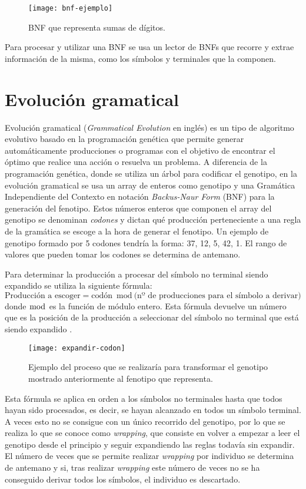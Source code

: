 \begin{figure}[H]
\centering
\texttt{[image: bnf-ejemplo]}
\caption{BNF que representa sumas de dígitos.}
\end{figure}

Para procesar y utilizar una BNF se usa un lector de BNFs que recorre y extrae información de la misma, como los símbolos y terminales que la componen.

\section{Evolución gramatical}
Evolución gramatical (\textit{Grammatical Evolution} en inglés) es un tipo de algoritmo evolutivo basado en la programación genética que permite generar automáticamente producciones o programas  con el objetivo de encontrar el óptimo que realice una acción o resuelva un problema. A diferencia de la programación genética, donde se utiliza un árbol para codificar el genotipo, en la evolución gramatical se usa un array de enteros como genotipo y una Gramática Independiente del Contexto en notación \textit{Backus-Naur Form} (BNF) para la generación del fenotipo. Estos números enteros que componen el array del genotipo se denominan \textit{codones} y dictan qué producción perteneciente a una regla de la gramática se escoge a la hora de generar el fenotipo. Un ejemplo de genotipo formado por 5 codones tendría la forma: 37, 12, 5, 42, 1. El rango de valores que pueden tomar los codones se determina de antemano.

Para determinar la producción a procesar del símbolo no terminal siendo expandido se utiliza la siguiente fórmula:
\begin{equation}
\textrm{Producción a escoger} = \textrm{codón} \bmod \textrm{(nº de producciones para el símbolo a derivar)}
\end{equation}
donde $\bmod$ es la función de módulo entero. Esta fórmula devuelve un número que es la posición de la producción a seleccionar del símbolo no terminal que está siendo expandido \cite{o2012grammatical}.

\begin{figure}[H]
\centering
\texttt{[image: expandir-codon]}
\caption{Ejemplo del proceso que se realizaría para transformar el genotipo mostrado anteriormente al fenotipo que representa.}
\end{figure}

Esta fórmula se aplica en orden a los símbolos no terminales hasta que todos hayan sido procesados, es decir, se hayan alcanzado en todos un símbolo terminal. A veces esto no se consigue con un único recorrido del genotipo, por lo que se realiza lo que se conoce como \textit{wrapping}, que consiste en  volver a empezar a leer el genotipo desde el principio y seguir expandiendo las reglas todavía sin expandir. El número de veces que se permite realizar \textit{wrapping} por individuo se determina de antemano y si, tras realizar \textit{wrapping} este número de veces no se ha conseguido derivar todos los símbolos, el individuo es descartado.

